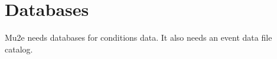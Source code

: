 \section{Databases}
\label{sec:databases}
Mu2e needs databases for conditions data.  It also needs an event data file catalog.

